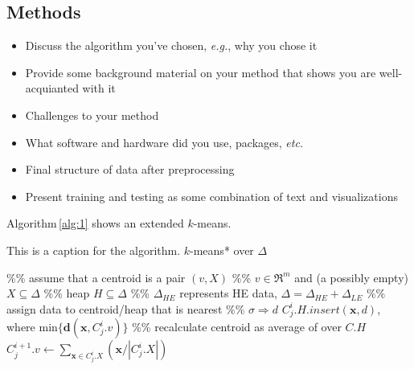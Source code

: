 \documentclass[fleqn,10pt]{SelfArx} %
\begin{document}
\lipsum[6] %

\subsection{Methods}
\begin{itemize}[noitemsep]
\item Discuss the algorithm you've chosen, \textit{e.g.}, why you chose it
\item Provide some background material on your method that shows you are well-acquianted with it
\item Challenges to your method
\item What software and hardware did you use, packages, \textit{etc.}
\item Final structure of data after preprocessing
\item Present training and testing as some combination of text and visualizations
\end{itemize}
Algorithm\,\ref{alg:1} shows an extended $k$-means.

\begin{algorithm}
\caption{This is a caption for the algorithm.  $k$-means* over $\Delta$}
\label{alg:1}
\begin{algorithmic}[1]
\STATE \%\% assume that a centroid is a pair $(v,X)$
\STATE \%\% $v\in \Re^m$ and (a possibly empty) $ X\subseteq \Delta$
\STATE \%\% heap $ H \subseteq \Delta$
\STATE \%\% $\Delta_{HE}$ represents HE data, $\Delta = \Delta_{HE} +  \Delta_{LE}$
\REPEAT
{}
\STATE \%\% assign data to centroid/heap that is nearest
\STATE \%\% $\sigma \Rightarrow d$
\STATE $C_j^i.H.insert(\mathbf{x},d)$, where min$\{ \textbf{d}(\mathbf{x}, C_j^i.v)\}$
\ENDFOR
\ENDFOR
\STATE{\ $\Delta^\prime \leftarrow \emptyset$}
\STATE \%\% recalculate centroid as average of over $C.H$
\STATE $C_j^{i+1}.v \leftarrow  \sum\nolimits_{\mathbf{x} \in C_j^i.X} (\mathbf{x}/|C_j^i.X|) $
\ENDFOR
{}
\end{algorithmic}
\end{algorithm}
\end{document}
